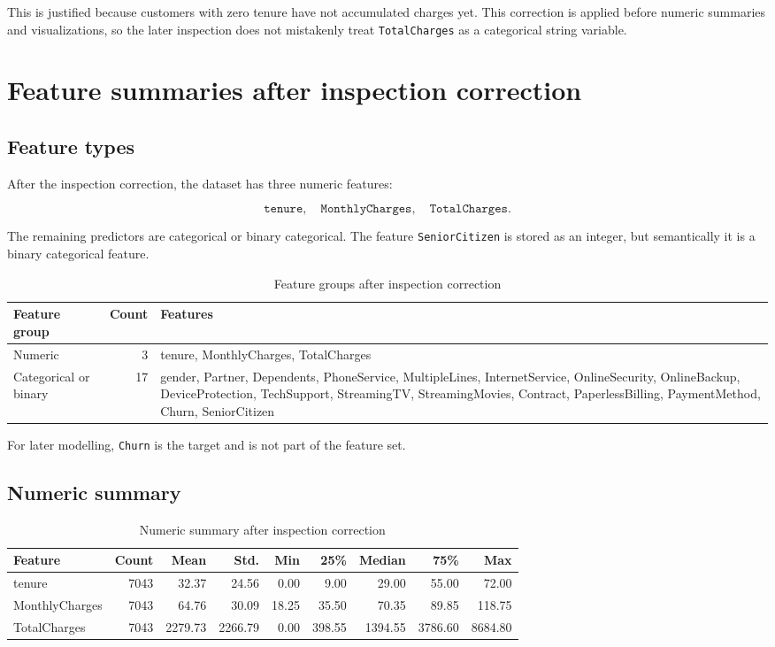 This is justified because customers with zero tenure have not accumulated charges yet. This correction is applied before numeric summaries and visualizations, so the later inspection does not mistakenly treat \texttt{TotalCharges} as a categorical string variable.


\section{Feature summaries after inspection correction}

\subsection{Feature types}

After the inspection correction, the dataset has three numeric features:

\[
\texttt{tenure}, \quad \texttt{MonthlyCharges}, \quad \texttt{TotalCharges}.
\]

The remaining predictors are categorical or binary categorical. The feature \texttt{SeniorCitizen} is stored as an integer, but semantically it is a binary categorical feature.

\begin{table}[H]
\centering
\caption{Feature groups after inspection correction}
\begin{tabular}{lrp{9cm}}
\toprule
Feature group & Count & Features \\
\midrule
Numeric & 3 & tenure, MonthlyCharges, TotalCharges \\
Categorical or binary & 17 & gender, Partner, Dependents, PhoneService, MultipleLines, InternetService, OnlineSecurity, OnlineBackup, DeviceProtection, TechSupport, StreamingTV, StreamingMovies, Contract, PaperlessBilling, PaymentMethod, Churn, SeniorCitizen \\
\bottomrule
\end{tabular}
\end{table}

For later modelling, \texttt{Churn} is the target and is not part of the feature set.

\subsection{Numeric summary}

\begin{table}[H]
\centering
\caption{Numeric summary after inspection correction}
\begin{tabular}{lrrrrrrrr}
\toprule
Feature & Count & Mean & Std. & Min & 25\% & Median & 75\% & Max \\
\midrule
tenure & 7043 & 32.37 & 24.56 & 0.00 & 9.00 & 29.00 & 55.00 & 72.00 \\
MonthlyCharges & 7043 & 64.76 & 30.09 & 18.25 & 35.50 & 70.35 & 89.85 & 118.75 \\
TotalCharges & 7043 & 2279.73 & 2266.79 & 0.00 & 398.55 & 1394.55 & 3786.60 & 8684.80 \\
\bottomrule
\end{tabular}
\end{table}

